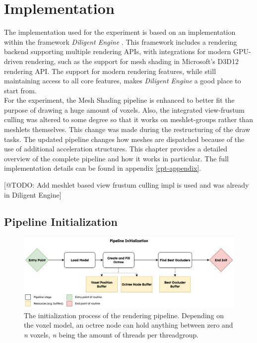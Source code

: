 \chapter{Implementation} \label{cpt-implementation}

The implementation used for the experiment is based on an implementation within the framework \emph{Diligent Engine} 
\cite{DiligentGraphicsGitHub, DiligentGraphics}. This framework includes a rendering backend supporting 
multiple rendering \ac{API}s, with integrations for modern \ac{GPU}-driven rendering, such as the support for 
mesh shading in Microsoft's D3D12 rendering \ac{API}. The support for modern rendering features, while still 
maintaining access to all core features, makes \emph{Diligent Engine} a good place to start from.\\

\noindent
For the experiment, the Mesh Shading pipeline is enhanced to better fit the purpose of drawing a huge amount of voxels. 
Also, the integrated view-frustum culling was altered to some degree so that it works on meshlet-groups rather 
than meshlets themselves. This change was made during the restructuring of the draw tasks. The updated pipeline 
changes how meshes are dispatched because of the use of additional acceleration structures. This chapter provides 
a detailed overview of the complete pipeline and how it works in particular. The full implementation details can be 
found in appendix \ref{cpt-appendix}.

[@TODO: Add meshlet based view frustum culling impl is used and was already in Diligent Engine]

\section{Pipeline Initialization} \label{sec-piepline-initialization}

\begin{figure}[h]
    \centering
    \includegraphics[width=\linewidth]{images/graphics/pipeline-initialization.jpg}
    \caption{The initialization process of the rendering pipeline. Depending on the voxel model, an octree node 
    can hold anything between zero and \emph{n} voxels, \emph{n} being the amount of threads per threadgroup.}
    \label{fig:pipeline-initialization}
\end{figure}

